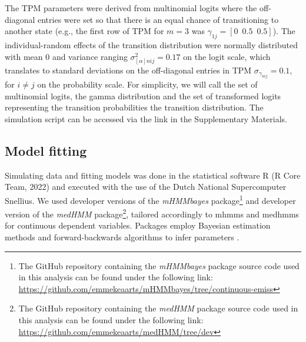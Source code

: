 The TPM parameters were derived from multinomial logits where the off-diagonal entries were set so that there is an equal chance of transitioning to another state (e.g., the first row of TPM for $m=3$ was $\gamma_{1j}=[0 \,\,\, 0.5 \,\,\, 0.5]$). The individual-random effects of the transition distribution were normally
distributed with mean $0$ and variance ranging ${\sigma^2_{[\alpha]nij}=0.17}$ on the logit scale,
which translates to standard deviations on the off-diagonal entries in TPM ${\sigma_{\gamma_{nij}}=0.1}$, for ${i\neq j}$ on the probability scale. For simplicity, we will call the set of multinomial logits, the gamma distribution and the set of transformed logits representing the transition probabilities the transition distribution. The simulation script can be accessed via the link in the Supplementary Materials. 

\subsection{Model fitting}
Simulating data and fitting models was done in the statistical software R (R Core Team, 2022) and executed with the use of the Dutch National Supercomputer Snellius. We used developer versions of the \emph{mHMMbayes} package\footnote{The GitHub repository containing the \emph{mHMMbayes} package source code used in this analysis can be found under the following link: \url{https://github.com/emmekeaarts/mHMMbayes/tree/continuous-emiss}} \citep{mHMMbayespackage} and developer version of the \emph{medHMM} package\footnote{The GitHub repository containing the \emph{medHMM} package source code used in this analysis can be found under the following link: \url{https://github.com/emmekeaarts/medHMM/tree/dev}}, tailored accordingly to \ac{mhmm}s and \ac{medhmm}s for continuous dependent variables. Packages employ Bayesian estimation methods \citep{Emm_Th,Scott_2002} and forward-backwards algorithms to infer parameters \citep{Scott_2002}. 

